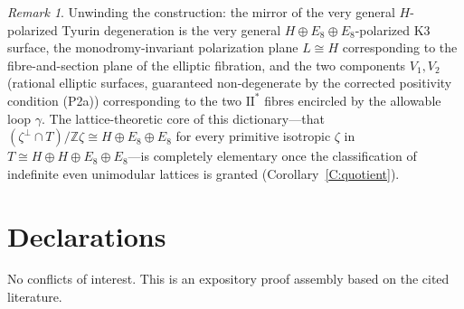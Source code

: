 \documentclass[11pt]{amsart}
\theoremstyle{plain}
\theoremstyle{definition}
\theoremstyle{remark}
\newtheorem{remark}[theorem]{Remark}
\numberwithin{equation}{section}
\begin{document}
\begin{remark}
Unwinding the construction: the mirror of the very general
\(H\)-polarized Tyurin degeneration is the very general
\(H\oplus E_{8}\oplus E_{8}\)-polarized K3 surface, the monodromy-invariant
polarization plane \(L\cong H\) corresponding to the fibre-and-section plane
of the elliptic fibration, and the two components \(V_{1},V_{2}\)
(rational elliptic surfaces, guaranteed non-degenerate by the corrected
positivity condition (P2a)) corresponding to the two
\(\mathrm{II}^{*}\) fibres encircled by the allowable loop \(\gamma\). The
lattice-theoretic core of this dictionary---that
\((\zeta^{\perp}\cap T)/\mathbb Z\zeta\cong H\oplus E_{8}\oplus E_{8}\) for
every primitive isotropic \(\zeta\) in
\(T\cong H\oplus H\oplus E_{8}\oplus E_{8}\)---is completely elementary once
the classification of indefinite even unimodular lattices is granted
(Corollary~\ref{C:quotient}).
\end{remark}

\section*{Declarations}
No conflicts of interest. This is an expository proof assembly based on the
cited literature.
\end{document}
